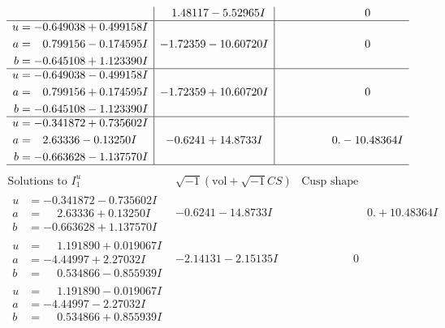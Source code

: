 \documentclass[1p]{elsarticle_modified}
\theoremstyle{definition}
\newcommand{\I}{\sqrt{-1}}
\begin{document}
$$\begin{array}{c|c|c}
 & \phantom{-}1.48117 - 5.52965 I & \phantom{-0.000000 } 0 \\ \hline\begin{aligned}
u &= -0.649038 + 0.499158 I \\
a &= \phantom{-}0.799156 - 0.174595 I \\
b &= -0.645108 + 1.123390 I\end{aligned}
 & -1.72359 - 10.60720 I & \phantom{-0.000000 } 0 \\ \hline\begin{aligned}
u &= -0.649038 - 0.499158 I \\
a &= \phantom{-}0.799156 + 0.174595 I \\
b &= -0.645108 - 1.123390 I\end{aligned}
 & -1.72359 + 10.60720 I & \phantom{-0.000000 } 0 \\ \hline\begin{aligned}
u &= -0.341872 + 0.735602 I \\
a &= \phantom{-}2.63336 - 0.13250 I \\
b &= -0.663628 - 1.137570 I\end{aligned}
 & -0.6241 + 14.8733 I & \phantom{-0.000000 } 0. - 10.48364 I\\
 \hline 
 \end{array}$$\newpage$$\begin{array}{c|c|c}  
\text{Solutions to }I^u_{1}& \I (\text{vol} + \sqrt{-1}CS) & \text{Cusp shape}\\
 \hline 
\begin{aligned}
u &= -0.341872 - 0.735602 I \\
a &= \phantom{-}2.63336 + 0.13250 I \\
b &= -0.663628 + 1.137570 I\end{aligned}
 & -0.6241 - 14.8733 I & \phantom{-0.000000 -}0. + 10.48364 I \\ \hline\begin{aligned}
u &= \phantom{-}1.191890 + 0.019067 I \\
a &= -4.44997 + 2.27032 I \\
b &= \phantom{-}0.534866 - 0.855939 I\end{aligned}
 & -2.14131 - 2.15135 I & \phantom{-0.000000 } 0 \\ \hline\begin{aligned}
u &= \phantom{-}1.191890 - 0.019067 I \\
a &= -4.44997 - 2.27032 I \\
b &= \phantom{-}0.534866 + 0.855939 I\end{aligned}

\end{array}$$
\end{document}

